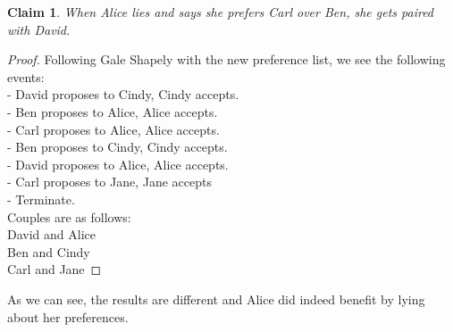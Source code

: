 \documentclass[11pt]{article}
\newtheorem{claim}[theorem]{Claim}
\begin{document}
	\begin{claim} 
		When Alice lies and says she prefers Carl over Ben, she gets paired with David.
	\end{claim}
	\begin{proof}
		Following Gale Shapely with the new preference list, we see the following events:\\
		- David proposes to Cindy, Cindy accepts.\\
		- Ben proposes to Alice, Alice accepts.\\
		- Carl proposes to Alice, Alice accepts.\\
		- Ben proposes to Cindy, Cindy accepts.\\
		- David proposes to Alice, Alice accepts.\\
		- Carl proposes to Jane, Jane accepts\\
		- Terminate. \\
		Couples are as follows:\\
		David and Alice\\
		Ben and Cindy\\
		Carl and Jane
	\end{proof}


As we can see, the results are different and Alice did indeed benefit by lying about her preferences.
	\newpage
	
	
\end{document}
